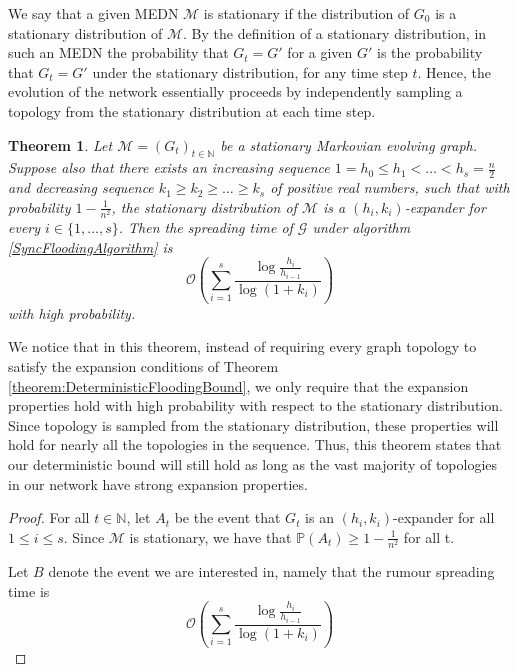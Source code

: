 \documentclass[a4paper,11pt]{article}
\newtheorem{theorem}{Theorem}[section]
\theoremstyle{definition}
\begin{document}
We say that a given MEDN $\mathcal{M}$ is stationary if the distribution of $G_0$ is a stationary distribution of $\mathcal{M}$. By the definition of a stationary distribution, in such an MEDN the probability that $G_t = G'$ for a given $G'$ is the probability that $G_t = G'$ under the stationary distribution, for any time step $t$. Hence, the evolution of the network essentially proceeds by independently sampling a topology from the stationary distribution at each time step. %

\begin{theorem}
	Let $\mathcal{M} = (G_t)_{t \in \mathbb{N}}$  be a stationary Markovian evolving graph. Suppose also that there exists an increasing sequence $1 = h_0 \leq h_1 < \dots < h_s = \frac{n}{2}$ and decreasing sequence $k_1 \geq k_2 \geq \dots \geq k_s$ of positive real numbers, such that with probability $1-\frac{1}{n^2}$, the stationary distribution of $\mathcal{M}$ is a $(h_i, k_i)$-expander for every $i \in \{1, \dots , s\}$. Then the spreading time of $\mathcal{G}$ under algorithm \ref{SyncFloodingAlgorithm} is
	$$
		\mathcal{O}\left(\sum_{i=1}^s \frac{\log \frac{h_i}{h_{i-1}}}{\log(1+k_i)}\right)
	$$
	with high probability.
\end{theorem}

We notice that in this theorem, instead of requiring every graph topology to satisfy the expansion conditions of Theorem \ref{theorem:DeterministicFloodingBound}, we only require that the expansion properties hold with high probability with respect to the stationary distribution. Since topology is sampled from the stationary distribution, these properties will hold for nearly all the topologies in the sequence. Thus, this theorem states that our deterministic bound will still hold as long as the vast majority of topologies in our network have strong expansion properties. 

\begin{proof}
	For all $t \in \mathbb{N}$, let $A_t$ be the event that $G_t$ is an $(h_i, k_i)$-expander for all $1 \leq i \leq s$. Since $\mathcal{M}$ is stationary, we have that $\mathbb{P}(A_t) \geq 1 - \frac{1}{n^2}$ for all t. 

	Let $B$ denote the event we are interested in, namely that the rumour spreading time is 	
	$$
		\mathcal{O}\left(\sum_{i=1}^s \frac{\log \frac{h_i}{h_{i-1}}}{\log(1+k_i)}\right)
	$$

\end{proof}
\end{document}
